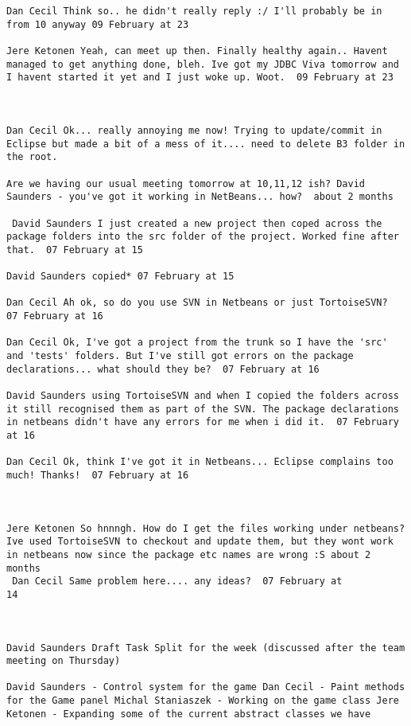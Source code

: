 \documentclass[10pt]{report}
\begin{document}
\begin{verbatim}
Dan Cecil Think so.. he didn't really reply :/ I'll probably be in
from 10 anyway 09 February at 23

Jere Ketonen Yeah, can meet up then. Finally healthy again.. Havent
managed to get anything done, bleh. Ive got my JDBC Viva tomorrow and
I havent started it yet and I just woke up. Woot.  09 February at 23



Dan Cecil Ok... really annoying me now! Trying to update/commit in
Eclipse but made a bit of a mess of it.... need to delete B3 folder in
the root.

Are we having our usual meeting tomorrow at 10,11,12 ish? David
Saunders - you've got it working in NetBeans... how?  about 2 months

 David Saunders I just created a new project then coped across the
package folders into the src folder of the project. Worked fine after
that.  07 February at 15

David Saunders copied* 07 February at 15

Dan Cecil Ah ok, so do you use SVN in Netbeans or just TortoiseSVN?
07 February at 16

Dan Cecil Ok, I've got a project from the trunk so I have the 'src'
and 'tests' folders. But I've still got errors on the package
declarations... what should they be?  07 February at 16

David Saunders using TortoiseSVN and when I copied the folders across
it still recognised them as part of the SVN. The package declarations
in netbeans didn't have any errors for me when i did it.  07 February
at 16

Dan Cecil Ok, think I've got it in Netbeans... Eclipse complains too
much! Thanks!  07 February at 16



Jere Ketonen So hnnngh. How do I get the files working under netbeans?
Ive used TortoiseSVN to checkout and update them, but they wont work
in netbeans now since the package etc names are wrong :S about 2
months 
 Dan Cecil Same problem here.... any ideas?  07 February at
14



David Saunders Draft Task Split for the week (discussed after the team
meeting on Thursday)

David Saunders - Control system for the game Dan Cecil - Paint methods
for the Game panel Michal Staniaszek - Working on the game class Jere
Ketonen - Expanding some of the current abstract classes we have


\end{verbatim}
\end{document}
